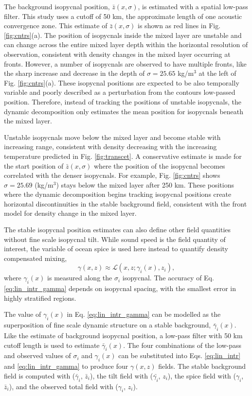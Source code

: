 \documentclass[preprint,NumberedRefs]{JASA}
\begin{document}
The background isopycnal position, $\bar{z}(x, \sigma)$, is estimated with a spatial low-pass filter. This study uses a cutoff of 50 km, the approximate length of one acoustic convergence zone\cite{jensen2011computational}. This estimate of $\bar{z}(x, \sigma)$ is shown as red lines in Fig. \ref{fig:cntrs}(a). The position of isopycnals inside the mixed layer are unstable and can change across the entire mixed layer depth within the horizontal resolution of observation, consistent with density changes in the mixed layer occurring at fronts. However, a number of isopycnals are observed to have multiple fronts, like the sharp increase and decrease in the depth of $\sigma=25.65$ kg/m$^3$ at the left of Fig. \ref{fig:cntrs}(a). These isopycnal positions are expected to be also temporally variable and poorly described as a perturbation from the contours low-passed position. Therefore, instead of tracking the positions of unstable isopycnals, the dynamic decomposition only estimates the mean position for isopycnals beneath the mixed layer.

Unstable isopycnals move below the mixed layer and become stable with increasing range, consistent with density decreasing with the increasing temperature predicted in Fig. \ref{fig:transcet}. A conservative estimate is made for the start position of $\bar{z}(x, \sigma)$ where the position of the isopycnal becomes correlated with the denser isopycnals. For example, Fig. \ref{fig:cntrs} shows $\sigma=25.69$ (kg/m$^3$) stays below the mixed layer after 250 km. These positions where the dynamic decomposition begins tracking isopycnal positions create horizontal discontinuities in the stable background field, consistent with the front model for density change in the mixed layer.

The stable isopycnal position estimates can also define other field quantities without fine scale isopycnal tilt. While sound speed is the field quantity of interest, the variable of ocean spice is used here instead to quantify density compensated mixing,
\begin{equation}
    \gamma(x, z)\approx\mathcal{L}(x, z; \gamma_i(x), z_i),
    \label{eq:lin_intr_gamma}
\end{equation}
where $\gamma_i(x)$ is measured along the $\sigma_i$ isopycnal. The accuracy of Eq. \eqref{eq:lin_intr_gamma} depends on isopycnal spacing, with the smallest error in highly stratified regions.

The value of $\gamma_i(x)$ in Eq. \eqref{eq:lin_intr_gamma} can be modelled as the superposition of fine scale dynamic structure on a stable background, $\bar{\gamma}_i(x)$. Like the estimate of background isopycnal position, a low-pass filter with 50 km cutoff length is used to estimate $\bar{\gamma}_i(x)$. The four combinations of the low-pass and observed values of $\sigma_i$ and $\gamma_i(x)$ can be substituted into Eqs. \eqref{eq:lin_intr} and \eqref{eq:lin_intr_gamma} to produce four $\gamma(x,z)$ fields. The stable background field is computed with ($\bar{\gamma}_i$, $\bar{z}_i$), the tilt field with ($\bar{\gamma_i}$, $z_i$), the spice field with ($\gamma_i$, $\bar{z}_i$), and the observed total field with ($\gamma_i$, $z_i$).
\end{document}
